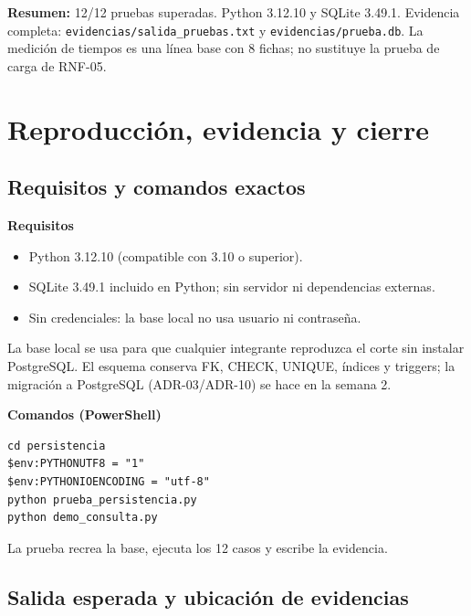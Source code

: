 \documentclass[11pt,a4paper]{article}
\newcommand{\code}[1]{\texttt{#1}}
\begin{document}
{\footnotesize
\textbf{Resumen:} 12/12 pruebas superadas. Python 3.12.10 y SQLite 3.49.1.
Evidencia completa: \code{evidencias/salida\_pruebas.txt} y
\code{evidencias/prueba.db}. La medición de tiempos es una línea base
con 8 fichas; no sustituye la prueba de carga de RNF-05.\par}

\clearpage

\section{Reproducción, evidencia y cierre}

\subsection{Requisitos y comandos exactos}

\noindent
\begin{minipage}[t]{0.44\linewidth}
\textbf{Requisitos}
\begin{itemize}
\item Python 3.12.10 (compatible con 3.10 o superior).
\item SQLite 3.49.1 incluido en Python; sin servidor ni dependencias externas.
\item Sin credenciales: la base local no usa usuario ni contraseña.
\end{itemize}
{\footnotesize
La base local se usa para que cualquier integrante reproduzca el corte sin instalar
PostgreSQL. El esquema conserva FK, CHECK, UNIQUE, índices y triggers; la migración a
PostgreSQL (ADR-03/ADR-10) se hace en la semana 2.\par}
\end{minipage}\hfill
\begin{minipage}[t]{0.53\linewidth}
\textbf{Comandos (PowerShell)}
\begin{lstlisting}
cd persistencia
$env:PYTHONUTF8 = "1"
$env:PYTHONIOENCODING = "utf-8"
python prueba_persistencia.py
python demo_consulta.py
\end{lstlisting}
{\footnotesize
La prueba recrea la base, ejecuta los 12 casos y escribe la evidencia.\par}
\end{minipage}

\subsection{Salida esperada y ubicación de evidencias}
\end{document}
